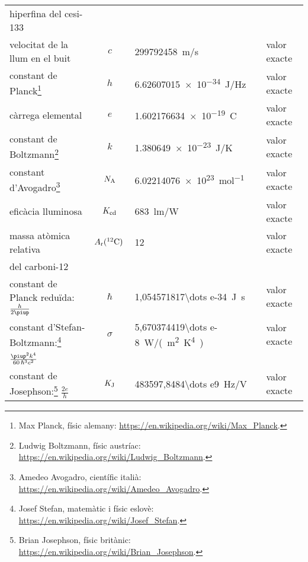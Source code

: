 \begin{ThreePartTable}
\begin{longtable}{lcll}
	hiperfina del cesi-133 & & & \index{$\Deltaup\nu\ped{Cs}$}\\[1em]
	velocitat de la llum en el buit & $c$ & \qty{299 792 458}{m/s} & valor exacte \index{c@$c$}\\[1em]
	constant de Planck\footnote{Max  Planck, físic alemany: \href{https://en.wikipedia.org/wiki/Max_Planck}{https:/\!\!/en.wikipedia.org/wiki/Max\_Planck}.} & $h$ & \qty{6,62607015 e-34}{J/Hz} & valor exacte\index{constants!de Planck}\index{h@$h$}\\[1em]
	càrrega elemental & $e$ & \qty{1,602176634 e-19}{C} & valor exacte\index{carrega@càrrega!elemental}\index{e@$e$}\\[1em]
	constant de Boltzmann\footnote{Ludwig  Boltzmann, físic austríac: \href{https://en.wikipedia.org/wiki/Ludwig_Boltzmann}{https:/\!\!/en.wikipedia.org/wiki/Ludwig\_Boltzmann}.} & $k$ & \qty{1,380649e-23}{J/K} & valor exacte\index{constants!de Boltzmann}\index{k@$k$}\\[1em]
	constant d'Avogadro\tnote{\color{blue}(a)}\hspace{4mm}\footnote{Amedeo Avogadro, científic italià: \href{https://en.wikipedia.org/wiki/Amedeo_Avogadro}{https:/\!\!/en.wikipedia.org/wiki/Amedeo\_Avogadro}.} & $N\ped{A}$ & \qty{6,02214076 e23}{mol^{-1}} & valor exacte\index{constants!d'Avogadro}\index{NA@$N\ped{A}$}\\[1em]
	eficàcia lluminosa\tnote{\color{blue}(b)} & $K\ped{cd}$ & \qty{683}{lm/W} & valor exacte\index{eficàcia lluminosa}\index{Kcd@$K\ped{cd}$}\\[1em]
	massa atòmica relativa\tnote{\color{blue}(c)} & $A_\mathrm{r}({}^{12}\mathrm{C})\,$ & 12 & valor exacte\\
	del carboni-12 & & &\index{massa!atòmica relativa del carboni-12}\index{Ar@$A\ped{r}({}^{12}\mathrm{C})$}\\[1em]
	constant de Planck reduïda: $\frac{h}{2\piup}$ & $\hslash$ & \qty{1,054571817\dots e-34}{J.s} & valor exacte\index{constants!de Planck redu\"{i}da}\index{h@$\hslash$}\\[.8em]
	constant d'Stefan-Boltzmann:\footnote{Josef Stefan, matemàtic i físic eslovè: \href{https://en.wikipedia.org/wiki/Josef_Stefan}{https:/\!\!/en.wikipedia.org/wiki/Josef\_Stefan}.}  & $\sigma$ & \qty{5,670374419\dots e-8}{W/(m^2.K^4)} & valor exacte\index{constants!d'Stefan-Boltzmann}\index{$\sigma$}\\ 
	$\frac{\piup^2 k^4}{60\, \hslash^3 c^2}$ & & & \\[0.8em]
	constant de Josephson:\footnote{Brian Josephson, físic britànic: \href{https://en.wikipedia.org/wiki/Brian_Josephson}{https:/\!\!/en.wikipedia.org/wiki/Brian\_Josephson}.} $\frac{2 e}{h}$ & $K\ped{J}$ & \qty{483597,8484\dots e9}{Hz/V} & valor exacte\index{constants!de Josephson}\index{KJ@$K\ped{J}$}\\[0.9em]

\end{longtable}
\end{ThreePartTable}
